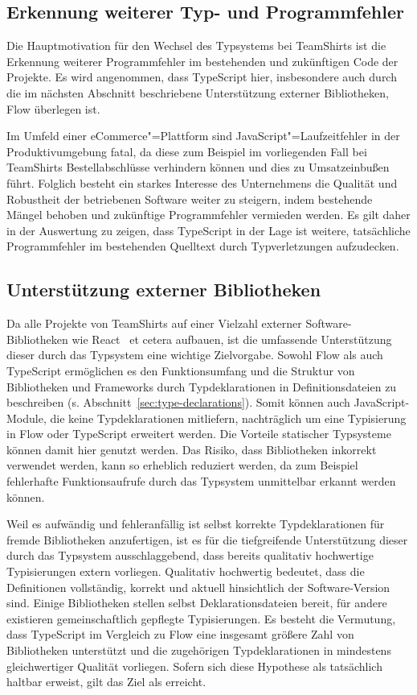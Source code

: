 \subsection{Erkennung weiterer Typ- und Programmfehler}

Die Hauptmotivation für den Wechsel des Typsystems bei TeamShirts ist die Erkennung weiterer Programmfehler im bestehenden und zukünftigen Code der Projekte. Es wird angenommen, dass TypeScript hier, insbesondere auch durch die im nächsten Abschnitt beschriebene Unterstützung externer Bibliotheken, Flow überlegen ist.

Im Umfeld einer eCommerce"=Plattform sind JavaScript"=Laufzeitfehler in der Produktivumgebung fatal, da diese zum Beispiel im vorliegenden Fall bei TeamShirts Bestellabschlüsse verhindern können und dies zu Umsatzeinbußen führt. Folglich besteht ein starkes Interesse des Unternehmens die Qualität und Robustheit der betriebenen Software weiter zu steigern, indem bestehende Mängel behoben und zukünftige Programmfehler vermieden werden. Es gilt daher in der Auswertung zu zeigen, dass TypeScript in der Lage ist weitere, tatsächliche Programmfehler im bestehenden Quelltext durch Typverletzungen aufzudecken.

\subsection{Unterstützung externer Bibliotheken}

Da alle Projekte von TeamShirts auf einer Vielzahl externer Software-Bibliotheken wie React~\autocite{SOFTWARE:REACT} et cetera aufbauen, ist die umfassende Unterstützung dieser durch das Typsystem eine wichtige Zielvorgabe. Sowohl Flow als auch TypeScript ermöglichen es den Funktionsumfang und die Struktur von Bibliotheken und Frameworks durch Typdeklarationen in Definitionsdateien zu beschreiben (s. Abschnitt~\ref{sec:type-declarations}). Somit können auch JavaScript-Module, die keine Typdeklarationen mitliefern, nachträglich um eine Typisierung in Flow oder TypeScript erweitert werden. Die Vorteile statischer Typsysteme können damit hier genutzt werden. Das Risiko, dass Bibliotheken inkorrekt verwendet werden, kann so erheblich reduziert werden, da zum Beispiel fehlerhafte Funktionsaufrufe durch das Typsystem unmittelbar erkannt werden können.

Weil es aufwändig und fehleranfällig ist selbst korrekte Typdeklarationen für fremde Bibliotheken anzufertigen, ist es für die tiefgreifende Unterstützung dieser durch das Typsystem ausschlaggebend, dass bereits qualitativ hochwertige Typisierungen extern vorliegen. Qualitativ hochwertig bedeutet, dass die Definitionen vollständig, korrekt und aktuell hinsichtlich der Software-Version sind. Einige Bibliotheken stellen selbst Deklarationsdateien bereit, für andere existieren gemeinschaftlich gepflegte Typisierungen. Es besteht die Vermutung, dass TypeScript im Vergleich zu Flow eine insgesamt größere Zahl von Bibliotheken unterstützt und die zugehörigen Typdeklarationen in mindestens gleichwertiger Qualität vorliegen. Sofern sich diese Hypothese als tatsächlich haltbar erweist, gilt das Ziel als erreicht.

